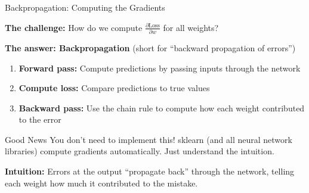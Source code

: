 \documentclass[10pt]{beamer}
\begin{document}
\begin{frame}{Backpropagation: Computing the Gradients}

  \textbf{The challenge:} How do we compute $\frac{\partial \text{Loss}}{\partial w}$ for all weights?

  \vspace{1em}
  \textbf{The answer: Backpropagation} (short for ``backward propagation of errors'')

  \vspace{0.5em}
  \begin{enumerate}
    \item \textbf{Forward pass:} Compute predictions by passing inputs through the network
    \item \textbf{Compute loss:} Compare predictions to true values
    \item \textbf{Backward pass:} Use the chain rule to compute how each weight contributed to the error
  \end{enumerate}

  \vspace{1em}
  \begin{block}{Good News}
    You don't need to implement this! sklearn (and all neural network libraries) compute gradients automatically. Just understand the intuition.
  \end{block}

  \vspace{0.5em}
  \textbf{Intuition:} Errors at the output ``propagate back'' through the network, telling each weight how much it contributed to the mistake.
\end{frame}

\end{document}
